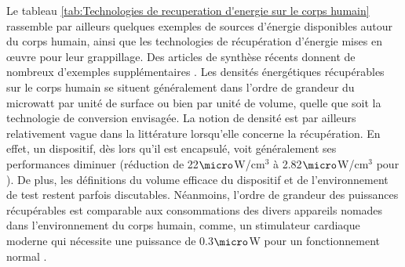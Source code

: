 Le tableau \ref{tab:Technologies de recuperation d'energie sur le corps humain} rassemble par ailleurs quelques exemples de  sources d'énergie disponibles autour du corps humain, ainsi que les technologies de récupération d'énergie mises en \oe{}uvre pour leur grappillage. Des articles de synthèse récents donnent de nombreux d'exemples supplémentaires \cite{Khalid2019,Kumari2020}. Les densités énergétiques récupérables sur le corps humain se situent généralement dans l'ordre de grandeur du microwatt par unité de surface ou bien par unité de volume, quelle que soit la technologie de conversion envisagée. La notion de densité est par ailleurs relativement vague dans la littérature lorsqu'elle concerne la récupération. En effet, un dispositif, dès lors qu'il est encapsulé, voit généralement ses performances diminuer (réduction de 22$\micro$W/cm$^3$ à 2.82$\micro$W/cm$^3$ pour \cite{Azimi2021}). De plus, les définitions du volume efficace du dispositif et de l'environnement de test restent parfois discutables. Néanmoins, l'ordre de grandeur des puissances récupérables est comparable aux consommations des divers appareils nomades dans l'environnement du corps humain, comme, un stimulateur cardiaque moderne qui nécessite une puissance de 0.3$\micro$W pour un fonctionnement normal \cite{Kumari2020}.
